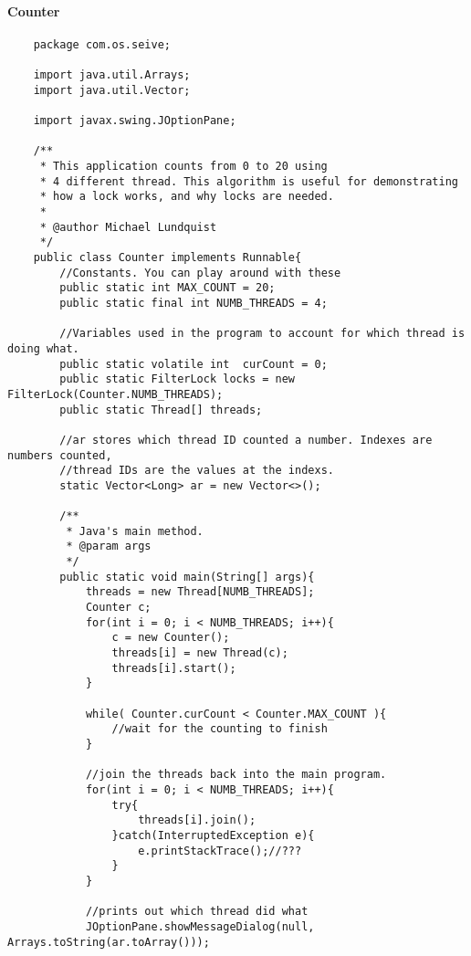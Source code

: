 \documentclass[titlepage]{article}
\begin{document}
\paragraph*{Counter}

\begin{singlespace}
\begin{lstlisting}
    package com.os.seive;

    import java.util.Arrays;
    import java.util.Vector;
    
    import javax.swing.JOptionPane;
    
    /**
     * This application counts from 0 to 20 using 
     * 4 different thread. This algorithm is useful for demonstrating
     * how a lock works, and why locks are needed.
     * 
     * @author Michael Lundquist
     */
    public class Counter implements Runnable{
        //Constants. You can play around with these
        public static int MAX_COUNT = 20;
        public static final int NUMB_THREADS = 4;
    
        //Variables used in the program to account for which thread is doing what.
        public static volatile int  curCount = 0;
        public static FilterLock locks = new FilterLock(Counter.NUMB_THREADS);
        public static Thread[] threads;
    
        //ar stores which thread ID counted a number. Indexes are numbers counted, 
        //thread IDs are the values at the indexs.
        static Vector<Long> ar = new Vector<>();    
    
        /**
         * Java's main method.
         * @param args
         */
        public static void main(String[] args){
            threads = new Thread[NUMB_THREADS];
            Counter c;
            for(int i = 0; i < NUMB_THREADS; i++){
                c = new Counter();            
                threads[i] = new Thread(c);
                threads[i].start();
            }
    
            while( Counter.curCount < Counter.MAX_COUNT ){
                //wait for the counting to finish
            }
    
            //join the threads back into the main program.
            for(int i = 0; i < NUMB_THREADS; i++){
                try{
                    threads[i].join();
                }catch(InterruptedException e){
                    e.printStackTrace();//???
                }
            }
    
            //prints out which thread did what
            JOptionPane.showMessageDialog(null, Arrays.toString(ar.toArray()));
    

\end{lstlisting}
\end{singlespace}
\end{document}
